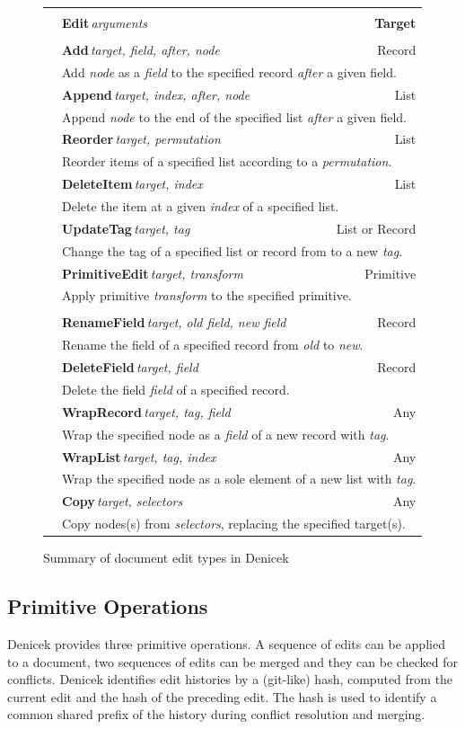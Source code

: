 \documentclass[sigconf]{acmart}
\begin{document}
\begin{figure}
\newcommand{\ektablecol}[5]{
\raisebox{-0.2em}{#1} & \sffamily\small{\bfseries #2}\,\;\textit{\footnotesize target, #3} & \sffamily\footnotesize #4 \\[-0.2em]
&\multicolumn{2}{l|}{\sffamily\footnotesize #5}\\[0.3em]
}
\begin{tabular}{|cp{16em}r|}
\hline
\rowcolor{ekgray}
&&\\[-1em]
\rowcolor{ekgray}
 & \sffamily\small{\bfseries Edit}\;\,\textit{\footnotesize arguments} & \sffamily\footnotesize\bfseries Target \\[0.2em]
\hline
&&\\[-1em]
\ektablecol{\faPlus}{Add}{field, after, node}{Record}
  {Add \textit{node} as a \textit{field} to the specified record \textit{after} a given field.}
\ektablecol{\faAt}{Append}{index, after, node}{List}
  {Append \textit{node} to the end of the specified list \textit{after} a given field.}
\ektablecol{\faSort}{Reorder}{permutation}{List}
  {Reorder items of a specified list according to a \textit{permutation}.}
\ektablecol{\faMinusCircle}{DeleteItem}{index}{List}
  {Delete the item at a given \textit{index} of a specified list.}
\ektablecol{\faCode}{UpdateTag}{tag}{List or Record}
  {Change the tag of a specified list or record from to a new \textit{tag}.}
\ektablecol{\faICursor}{PrimitiveEdit}{transform}{Primitive}
  {Apply primitive \textit{transform} to the specified primitive.}
\hline
&&\\[-1em]
\ektablecol{\faFont}{RenameField}{old field, new field}{Record}
  {Rename the field of a specified record from \textit{old} to \textit{new}.}
\ektablecol{\faTimesCircle}{DeleteField}{field}{Record}
  {Delete the field \textit{field} of a specified record.}
\ektablecol{\faFileO}{WrapRecord}{tag, field}{Any}
  {Wrap the specified node as a \textit{field} of a new record with \textit{tag}.}
\ektablecol{\faListUl}{WrapList}{tag, index}{Any}
  {Wrap the specified node as a sole element of a new list with \textit{tag}.}
\ektablecol{\faCopy}{Copy}{selectors}{Any}
  {Copy nodes(s) from \textit{selectors}, replacing the specified target(s). }
\hline
\end{tabular}
\caption{Summary of document edit types in Denicek}
\label{fig:edits}
\end{figure}



\subsection{Primitive Operations}
\label{sec:system-ops}
Denicek provides three primitive operations. A sequence of edits can be applied to a
document, two sequences of edits can be merged and they can be checked for conflicts. Denicek
identifies edit histories by a (git-like) hash, computed from the current edit and the hash of the
preceding edit. The hash is used to identify a common shared prefix of the
history during conflict resolution and merging.
\end{document}

